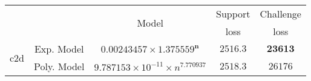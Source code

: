\begin{tabular}{ccccc} 
\hline 
 &  & \multirow{2}{*}{Model} & Support & Challenge\tabularnewline 
 &  &  & loss  & loss\tabularnewline 
\hline 
\hline 
\multirow{2}{*}{c2d} & Exp. Model & $\mathbf{0.00243457\times 1.375559^{n}}$ & $\mathbf{2516.3}$ & $\mathbf{23613}$ \tabularnewline 
 & Poly. Model & $9.787153\times10^{-11}\times n^{7.770937}$ & $2518.3$ & $26176$ \tabularnewline 
\hline 
\end{tabular} 

